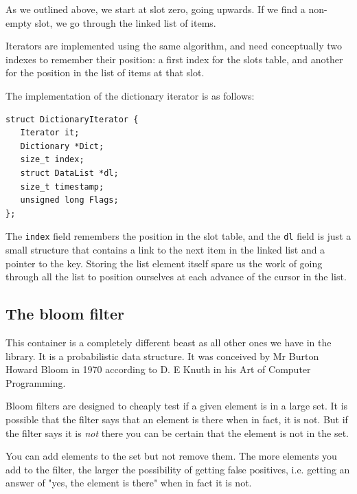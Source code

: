 \documentclass[12pt,a4paper,openany]{memoir} %
\newcommand{\container}{}
\begin{document}
{{As we outlined above, we start at slot zero, going upwards. If we find a non-empty slot, we go through the linked list of items.

Iterators are implemented using the same algorithm, and need conceptually two indexes to remember their position: a first index for the slots table, 
and another for the position in the list of items at that slot.

The implementation of the dictionary iterator is as follows:
\begin{verbatim}
struct DictionaryIterator {
   Iterator it;
   Dictionary *Dict;
   size_t index;
   struct DataList *dl;
   size_t timestamp;
   unsigned long Flags;
};
\end{verbatim}
The \texttt{index} field remembers the position in the slot table, and the \texttt{dl} field is just a small structure that contains a link to the 
next item in the linked list and a pointer to the key. Storing the list element itself spare us the work of going through all the list to position ourselves at each advance of the cursor in the list.
\subsection{The bloom filter}
\renewcommand{\container}{bloom filter}
This container is a completely different beast as all other ones we have in the library. It is a probabilistic data structure. It was conceived by
Mr Burton Howard Bloom in 1970 according to D. E Knuth in his Art of Computer Programming.

Bloom filters are designed to cheaply test if a given element is in a large set. It is possible that the filter says that an element is there
when in fact, it is not. But if the filter says it is \textsl{not} there you can be certain that the element is not in the set.

You can add elements to the set but not remove them. The more elements you add to the filter, the larger the possibility of getting false positives, i.e.
getting an answer of "yes, the element is there" when in fact it is not.


}}
\end{document}
